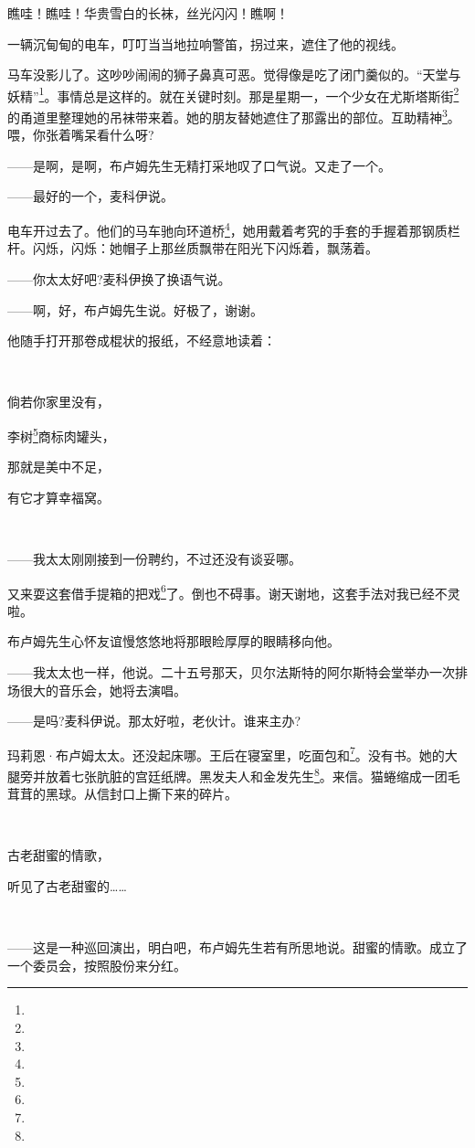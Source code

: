 \par 瞧哇！瞧哇！华贵雪白的长袜，丝光闪闪！瞧啊！
\par 一辆沉甸甸的电车，叮叮当当地拉响警笛，拐过来，遮住了他的视线。
\par 马车没影儿了。这吵吵闹闹的狮子鼻真可恶。觉得像是吃了闭门羹似的。“天堂与妖精”\footnote{}。事情总是这样的。就在关键时刻。那是星期一，一个少女在尤斯塔斯街\footnote{}的甬道里整理她的吊袜带来着。她的朋友替她遮住了那露出的部位。互助精神\footnote{}。喂，你张着嘴呆看什么呀?
\par ——是啊，是啊，布卢姆先生无精打采地叹了口气说。又走了一个。
\par ——最好的一个，麦科伊说。
\par 电车开过去了。他们的马车驰向环道桥\footnote{}，她用戴着考究的手套的手握着那钢质栏杆。闪烁，闪烁：她帽子上那丝质飘带在阳光下闪烁着，飘荡着。
\par ——你太太好吧?麦科伊换了换语气说。
\par ——啊，好，布卢姆先生说。好极了，谢谢。
\par 他随手打开那卷成棍状的报纸，不经意地读着：
\par  
\par 倘若你家里没有，
\par 李树\footnote{}商标肉罐头，
\par 那就是美中不足，
\par 有它才算幸福窝。
\par  
\par ——我太太刚刚接到一份聘约，不过还没有谈妥哪。
\par 又来耍这套借手提箱的把戏\footnote{}了。倒也不碍事。谢天谢地，这套手法对我已经不灵啦。
\par 布卢姆先生心怀友谊慢悠悠地将那眼睑厚厚的眼睛移向他。
\par ——我太太也一样，他说。二十五号那天，贝尔法斯特的阿尔斯特会堂举办一次排场很大的音乐会，她将去演唱。
\par ——是吗?麦科伊说。那太好啦，老伙计。谁来主办?
\par 玛莉恩·布卢姆太太。还没起床哪。王后在寝室里，吃面包和\footnote{}。没有书。她的大腿旁并放着七张肮脏的宫廷纸牌。黑发夫人和金发先生\footnote{}。来信。猫蜷缩成一团毛茸茸的黑球。从信封口上撕下来的碎片。
\par  
\par 古老甜蜜的情歌，
\par 听见了古老甜蜜的……
\par  
\par ——这是一种巡回演出，明白吧，布卢姆先生若有所思地说。甜蜜的情歌。成立了一个委员会，按照股份来分红。
